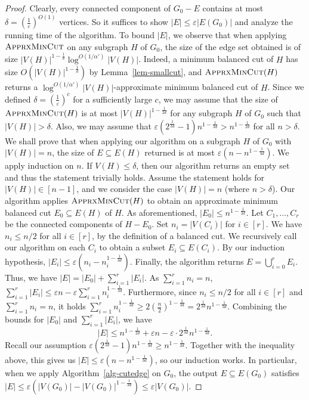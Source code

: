 \begin{proof}
Clearly, every connected component of $G_0 - E$ contains at most $\delta = (\frac{1}{\varepsilon})^{O(1)}$ vertices.
So it suffices to show $|E| \leq \varepsilon |E(G_0)|$ and analyze the running time of the algorithm.
To bound $|E|$, we observe that when applying $\textsc{ApprxMinCut}$ on any subgraph $H$ of $G_0$, the size of the edge set obtained is of size $|V(H)|^{1-\frac{1}{d}} \log^{O(1/\alpha')} |V(H)|$.
Indeed, a minimum balanced cut of $H$ has size $O(|V(H)|^{1-\frac{1}{d}})$ by Lemma~\ref{lem-smallcut}, and $\textsc{ApprxMinCut}(H)$ returns a $\log^{O(1/\alpha')} |V(H)|$-approximate minimum balanced cut of $H$.
Since we defined $\delta = (\frac{1}{\varepsilon})^c$ for a sufficiently large $c$, we may assume that the size of $\textsc{ApprxMinCut}(H)$ is at most $|V(H)|^{1-\frac{1}{2d}}$ for any subgraph $H$ of $G_0$ such that $|V(H)| > \delta$.
Also, we may assume that $\varepsilon (2^{\frac{1}{3d}}-1) n^{1-\frac{1}{3d}} > n^{1-\frac{1}{2d}}$ for all $n > \delta$.
We shall prove that when applying our algorithm on a subgraph $H$ of $G_0$ with $|V(H)|=n$, the size of $E \subseteq E(H)$ returned is at most $\varepsilon (n - n^{1-\frac{1}{3d}})$.
We apply induction on $n$.
If $V(H) \leq \delta$, then our algorithm returns an empty set and thus the statement trivially holds.
Assume the statement holds for $|V(H)| \in [n-1]$, and we consider the case $|V(H)| = n$ (where $n > \delta$).
Our algorithm applies $\textsc{ApprxMinCut}(H)$ to obtain an approximate minimum balanced cut $E_0 \subseteq E(H)$ of $H$.
As aforementioned, $|E_0| \leq n^{1-\frac{1}{2d}}$.
Let $C_1,\dots,C_r$ be the connected components of $H - E_0$.
Set $n_i = |V(C_i)|$ for $i \in [r]$.
We have $n_i \leq n/2$ for all $i \in [r]$, by the definition of a balanced cut.
We recursively call our algorithm on each $C_i$ to obtain a subset $E_i \subseteq E(C_i)$.
By our induction hypothesis, $|E_i| \leq \varepsilon(n_i - n_i^{1-\frac{1}{3d}})$.
Finally, the algorithm returns $E = \bigcup_{i=0}^r E_i$.
Thus, we have $|E| = |E_0| + \sum_{i=1}^r |E_i|$.
As $\sum_{i=1}^r n_i = n$, $\sum_{i=1}^r |E_i| \leq \varepsilon n - \varepsilon \sum_{i=1}^r n_i^{1-\frac{1}{3d}}$.
Furthermore, since $n_i \leq n/2$ for all $i \in [r]$ and $\sum_{i=1}^r n_i = n$, it holds $\sum_{i=1}^r n_i^{1-\frac{1}{3d}} \geq 2(\frac{n}{2})^{1-\frac{1}{3d}} = 2^{\frac{1}{3d}} n^{1-\frac{1}{3d}}$.
Combining the bounds for $|E_0|$ and $\sum_{i=1}^r |E_i|$, we have
\begin{equation*}
    |E| \leq n^{1-\frac{1}{2d}} + \varepsilon n - \varepsilon \cdot 2^{\frac{1}{3d}} n^{1-\frac{1}{3d}}.
\end{equation*}
Recall our assumption $\varepsilon (2^{\frac{1}{3d}}-1) n^{1-\frac{1}{3d}} \geq n^{1-\frac{1}{2d}}$.
Together with the inequality above, this gives us $|E| \leq \varepsilon (n - n^{1-\frac{1}{3d}})$, so our induction works.
In particular, when we apply Algorithm~\ref{alg-cutedge} on $G_0$, the output $E \subseteq E(G_0)$ satisfies $|E| \leq \varepsilon (|V(G_0)| - |V(G_0)|^{1-\frac{1}{3d}}) \leq \varepsilon |V(G_0)|$.


\end{proof}
